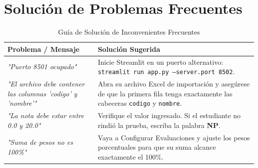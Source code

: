 \documentclass[12pt,a4paper]{article}
\begin{document}
\section{Solución de Problemas Frecuentes}

\begin{table}[h!]
\centering
\caption{Guía de Solución de Inconvenientes Frecuentes}
\begin{tabularx}{\textwidth}{X X}
\toprule
\textbf{Problema / Mensaje} & \textbf{Solución Sugerida} \\
\midrule
\textit{"Puerto 8501 ocupado"} & Inicie Streamlit en un puerto alternativo: \texttt{streamlit run app.py --server.port 8502}. \\
\textit{"El archivo debe contener las columnas 'codigo' y 'nombre'"} & Abra su archivo Excel de importación y asegúrese de que la primera fila tenga exactamente las cabeceras \texttt{codigo} y \texttt{nombre}. \\
\textit{"La nota debe estar entre 0.0 y 20.0"} & Verifique el valor ingresado. Si el estudiante no rindió la prueba, escriba la palabra \textbf{NP}. \\
\textit{"Suma de pesos no es 100\%"} & Vaya a Configurar Evaluaciones y ajuste los pesos porcentuales para que su suma alcance exactamente el 100\%. \\
\bottomrule
\end{tabularx}
\end{table}
\end{document}
